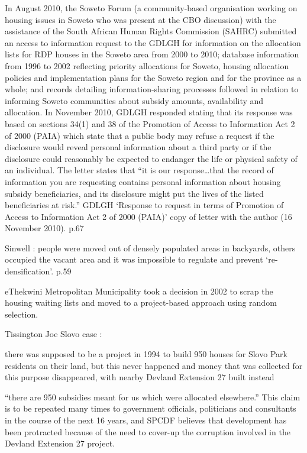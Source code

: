 \documentclass[12pt]{article}
\begin{document}
In August 2010, the Soweto Forum (a community-based organisation working on housing
issues in Soweto who was present at the CBO discussion) with the assistance of the South
African Human Rights Commission (SAHRC) submitted an access to information request to
the GDLGH for information on the allocation lists for RDP houses in the Soweto area from
2000 to 2010; database information from 1996 to 2002 reflecting priority allocations for
Soweto, housing allocation policies and implementation plans for the Soweto region and
for the province as a whole; and records detailing information-sharing processes followed in
relation to informing Soweto communities about subsidy amounts, availability and allocation.
In November 2010, GDLGH responded stating that its response was based on sections 34(1)
and 38 of the Promotion of Access to Information Act 2 of 2000 (PAIA) which state that a
public body may refuse a request if the disclosure would reveal personal information about a
third party or if the disclosure could reasonably be expected to endanger the life or physical
safety of an individual. The letter states that “it is our response…that the record of information
you are requesting contains personal information about housing subsidy beneficiaries, and its
disclosure might put the lives of the listed beneficiaries at risk.” GDLGH ‘Response to request in
terms of Promotion of Access to Information Act 2 of 2000 (PAIA)’ copy of letter with the author
(16 November 2010). p.67


Sinwell : people were moved out of densely populated areas in backyards, others occupied the vacant area and it was impossible to regulate and prevent ‘re-densification’. p.59


eThekwini Metropolitan Municipality took a decision in 2002 to scrap the housing waiting lists and moved to a project-based approach using random selection.


Tissington Joe Slovo case : 

there was supposed to be a project in 1994 to build 950 houses for
Slovo Park residents on their land, but this never happened and money that was collected
for this purpose disappeared, with nearby Devland Extension 27 built instead 

“there are 950 subsidies meant for us which were
allocated elsewhere.” This claim is to be repeated many times to government officials,
politicians and consultants in the course of the next 16 years, and SPCDF believes that
development has been protracted because of the need to cover-up the corruption involved
in the Devland Extension 27 project.
\end{document}
